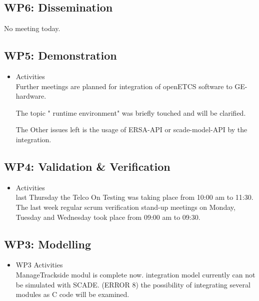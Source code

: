 \documentclass[a4paper, 11pt]{article}
\begin{document}
\subsection{WP6: Dissemination}

 No meeting today.
 
\subsection{WP5: Demonstration}

\begin{itemize}
\item Activities\\

Further meetings are planned for integration of openETCS software to GE- hardware.

The topic " runtime environment" was briefly touched and will be clarified.

The Other issues left is the usage of ERSA-API or scade-model-API by the integration.


\end{itemize}

\subsection{WP4: Validation \& Verification}
\begin{itemize}
\item Activities\\

  
last Thursday the Telco On Testing was taking place from 10:00 am  to 11:30. 
The last week regular scrum verification stand-up meetings on Monday, Tuesday and Wednesday  took place from 09:00 am to 09:30.



\end{itemize}

\subsection{WP3: Modelling}

\begin{itemize}
\item WP3 Activities\\
ManageTrackside modul is complete now.
integration model currently can not be simulated with SCADE.
(ERROR 8)
the possibility of integrating several modules as C code will be examined.


\end{itemize}
\end{document}
